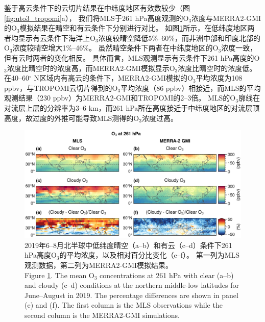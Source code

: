鉴于高云条件下的云切片结果在中纬度地区有效数较少（图\ref{fig:uto3_tropomi}a），
我们将MLS于261 hPa高度观测的O$_3$浓度与MERRA2-GMI的O$_3$模拟结果在晴空和有云条件下分别进行对比。
如图\ref{fig:mls_o3_261hpa}所示，在低纬度地区两者均显示有云条件下海洋上O$_3$浓度较晴空降低5\%--60\%，而非洲中部和印度北部的O$_3$浓度较晴空增大1\%--46\%。
虽然晴空条件下两者在中纬度地区的O$_3$浓度一致，但有云时两者的变化相反。
具体而言，MLS观测显示有云条件下261 hPa高度的O$_3$浓度比晴空时的浓度高，而MERRA2-GMI模拟显示O$_3$浓度比晴空时的浓度低。
在40--60$^{\circ}$ N区域内有高云的条件下，MERRA2-GMI模拟的O$_3$平均浓度为108 ppbv，与TROPOMI云切片得到的O$_3$平均浓度（86 ppbv）相接近，而MLS的平均观测结果（230 ppbv）为MERRA2-GMI和TROPOMI的2--3倍。
MLS的O$_3$廓线在对流层上层的分辨率为3--6 km，而261 hPa所在高度接近于中纬度地区的对流层顶高度，故过度的外推可能导致MLS测得的O$_3$浓度过高\citep{Schoeberl.2007}。


\begin{figure}[!htbp]
    \centering
    \includegraphics[width=15cm]{./figures/mls_o3_261hpa.png}
    \caption{
    2019年6--8月北半球中低纬度晴空（a--b）和有云（c--d）条件下261 hPa高度O$_3$的平均浓度，以及相对百分比变化（e--f）。
    第一列为MLS观测数据，第二列为MERRA2-GMI模拟结果。 \\
    Figure \ref{fig:mls_o3_261hpa}. The mean O$_3$ concentrations at 261 hPa with clear (a--b) and cloudy (c--d) conditions at the northern middle-low latitudes for June--August in 2019. The percentage differences are shown in panel (e) and (f).
    The first column is the MLS observations while the second column is the MERRA2-GMI simulations.
    }
    \label{fig:mls_o3_261hpa}
\end{figure}


